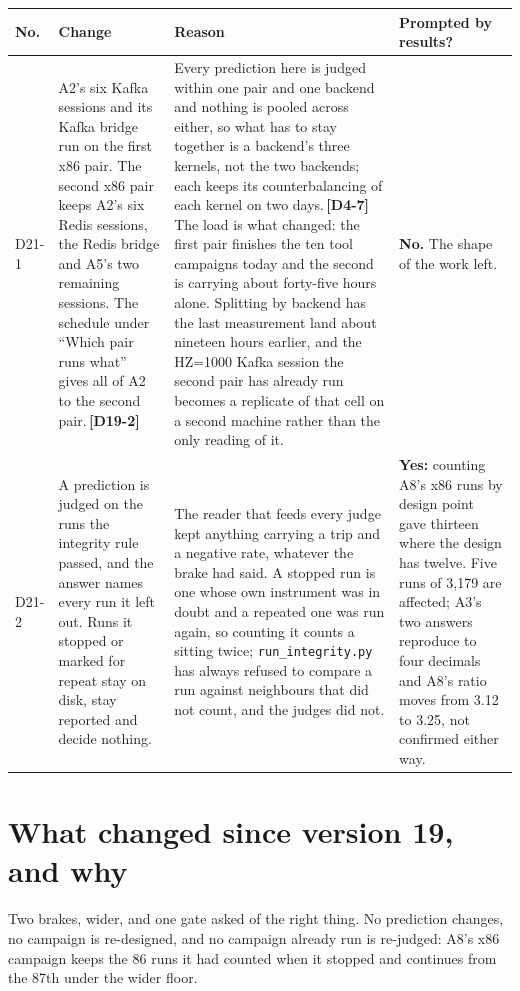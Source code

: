\documentclass[11pt]{article}
\newcommand{\chgold}[1]{\,{\color{oldcol}\bfseries\footnotesize[#1]}}
\begin{document}
{\small
\begin{longtable}{@{}p{1.1cm} >{\raggedright\arraybackslash}p{6.1cm} >{\raggedright\arraybackslash}p{6.0cm} >{\raggedright\arraybackslash}p{2.2cm}@{}}
\toprule
\textbf{No.} & \textbf{Change} & \textbf{Reason} & \textbf{Prompted by results?} \\
\midrule
\endhead
D21-1 & A2's six Kafka sessions and its Kafka bridge run on the first x86 pair. The second x86
pair keeps A2's six Redis sessions, the Redis bridge and A5's two remaining sessions. The
schedule under ``Which pair runs what'' gives all of A2 to the second pair.\chgold{D19-2} & Every
prediction here is judged within one pair and one backend and nothing is pooled across either, so
what has to stay together is a backend's three kernels, not the two backends; each keeps its
counterbalancing of each kernel on two days.\chgold{D4-7} The load is what changed: the first pair
finishes the ten tool campaigns today and the second is carrying about forty-five hours alone.
Splitting by backend has the last measurement land about nineteen hours earlier, and the HZ=1000
Kafka session the second pair has already run becomes a replicate of that cell on a second
machine rather than the only reading of it. & \textbf{No.} The shape of the work left. \\
D21-2 & A prediction is judged on the runs the integrity rule passed, and the answer names every
run it left out. Runs it stopped or marked for repeat stay on disk, stay reported and decide
nothing. & The reader that feeds every judge kept anything carrying a trip and a negative rate,
whatever the brake had said. A stopped run is one whose own instrument was in doubt and a repeated
one was run again, so counting it counts a sitting twice; \texttt{run\_integrity.py} has always
refused to compare a run against neighbours that did not count, and the judges did not. & \textbf{Yes:}
counting A8's x86 runs by design point gave thirteen where the design has twelve. Five runs of
3,179 are affected; A3's two answers reproduce to four decimals and A8's ratio moves from 3.12 to
3.25, not confirmed either way. \\
\bottomrule
\end{longtable}}

\section*{What changed since version 19, and why}
Two brakes, wider, and one gate asked of the right thing. No prediction changes, no campaign is
re-designed, and no campaign already run is re-judged: A8's x86 campaign keeps the 86 runs it had
counted when it stopped and continues from the 87th under the wider floor.
\end{document}
